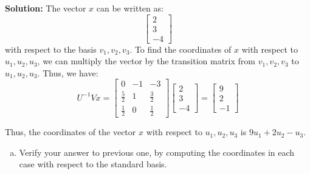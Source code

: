 \documentclass{article}
\begin{document}
\noindent\textbf{Solution:}
The vector $x$ can be written as:
$$\begin{bmatrix} 2 \\ 3 \\ -4 \end{bmatrix}$$
\noindent
with respect to the basis ${v_1, v_2, v_3}$.
To find the coordinates of $x$ with respect to ${u_1, u_2, u_3}$, we can multiply the vector by the transition matrix from ${v_1, v_2, v_3}$ to ${u_1, u_2, u_3}$.
Thus, we have:
$$
U^{-1}Vx =
\begin{bmatrix} 0 & -1 & -3 \\ \frac{5}{2} & 1 & \frac{3}{2} \\ \frac{1}{2} & 0 & \frac{1}{2} \end{bmatrix}
\begin{bmatrix} 2 \\ 3 \\ -4 \end{bmatrix}
=
\begin{bmatrix} 9 \\ 2 \\ -1 \end{bmatrix}
$$

\noindent
Thus, the coordinates of the vector $x$ with respect to ${u_1, u_2, u_3}$ is $9u_1 + 2u_2 - u_3$.
\newline

\begin{enumerate}[(e)]
    \item
    Verify your answer to previous one, by computing the coordinates in each case with respect to the standard basis.
\end{enumerate}
\end{document}
